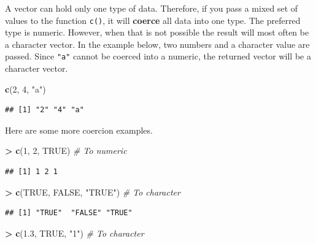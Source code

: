 \documentclass[]{book}
\newenvironment{Shaded}{\begin{snugshade}}{\end{snugshade}}
\newcommand{\CommentTok}[1]{\textcolor[rgb]{0.56,0.35,0.01}{\textit{#1}}}
\newcommand{\DecValTok}[1]{\textcolor[rgb]{0.00,0.00,0.81}{#1}}
\newcommand{\FloatTok}[1]{\textcolor[rgb]{0.00,0.00,0.81}{#1}}
\newcommand{\KeywordTok}[1]{\textcolor[rgb]{0.13,0.29,0.53}{\textbf{#1}}}
\newcommand{\NormalTok}[1]{#1}
\newcommand{\OperatorTok}[1]{\textcolor[rgb]{0.81,0.36,0.00}{\textbf{#1}}}
\newcommand{\OtherTok}[1]{\textcolor[rgb]{0.56,0.35,0.01}{#1}}
\newcommand{\StringTok}[1]{\textcolor[rgb]{0.31,0.60,0.02}{#1}}
\begin{document}
A vector can hold only one type of data. Therefore, if you pass a mixed set of values to the function \texttt{c()}, it will \textbf{coerce} all data into one type. The preferred type is numeric. However, when that is not possible the result will most often be a character vector. In the example below, two numbers and a character value are passed. Since \texttt{"a"} cannot be coerced into a numeric, the returned vector will be a character vector.

\begin{Shaded}
\begin{Highlighting}[]
\KeywordTok{c}\NormalTok{(}\DecValTok{2}\NormalTok{, }\DecValTok{4}\NormalTok{, }\StringTok{"a"}\NormalTok{) }
\end{Highlighting}
\end{Shaded}

\begin{verbatim}
## [1] "2" "4" "a"
\end{verbatim}

Here are some more coercion examples.

\begin{Shaded}
\begin{Highlighting}[]
\OperatorTok{>}\StringTok{ }\KeywordTok{c}\NormalTok{(}\DecValTok{1}\NormalTok{, }\DecValTok{2}\NormalTok{, }\OtherTok{TRUE}\NormalTok{) }\CommentTok{# To numeric}
\end{Highlighting}
\end{Shaded}

\begin{verbatim}
## [1] 1 2 1
\end{verbatim}

\begin{Shaded}
\begin{Highlighting}[]
\OperatorTok{>}\StringTok{ }\KeywordTok{c}\NormalTok{(}\OtherTok{TRUE}\NormalTok{, }\OtherTok{FALSE}\NormalTok{, }\StringTok{"TRUE"}\NormalTok{) }\CommentTok{# To character}
\end{Highlighting}
\end{Shaded}

\begin{verbatim}
## [1] "TRUE"  "FALSE" "TRUE"
\end{verbatim}

\begin{Shaded}
\begin{Highlighting}[]
\OperatorTok{>}\StringTok{ }\KeywordTok{c}\NormalTok{(}\FloatTok{1.3}\NormalTok{, }\OtherTok{TRUE}\NormalTok{, }\StringTok{"1"}\NormalTok{) }\CommentTok{# To character}
\end{Highlighting}
\end{Shaded}
\end{document}
